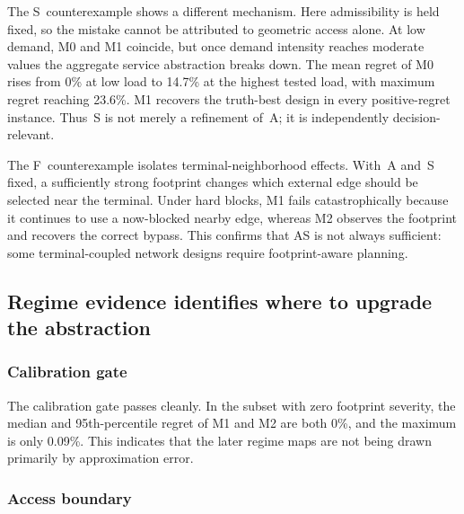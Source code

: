 \documentclass[review,authoryear]{elsarticle}
\begin{document}
The S~counterexample shows a different mechanism. Here admissibility is held fixed, so the mistake cannot be attributed to geometric access alone. At low demand, M0 and M1 coincide, but once demand intensity reaches moderate values the aggregate service abstraction breaks down. The mean regret of M0 rises from 0\% at low load to 14.7\% at the highest tested load, with maximum regret reaching 23.6\%. M1 recovers the truth-best design in every positive-regret instance. Thus~S is not merely a refinement of~A; it is independently decision-relevant.

The F~counterexample isolates terminal-neighborhood effects. With~A and~S fixed, a sufficiently strong footprint changes which external edge should be selected near the terminal. Under hard blocks, M1 fails catastrophically because it continues to use a now-blocked nearby edge, whereas M2 observes the footprint and recovers the correct bypass. This confirms that AS is not always sufficient: some terminal-coupled network designs require footprint-aware planning.

\begin{table}[htbp]
  \centering
  \caption{Minimal-counterexample results for A, S, and F.}
  \label{tab:counterexamples}
\end{table}

\subsection{Regime evidence identifies where to upgrade the abstraction}
\label{sec:results:regime}

\subsubsection{Calibration gate}
\label{sec:results:calibration}

The calibration gate passes cleanly. In the subset with zero footprint severity, the median and 95th-percentile regret of M1 and M2 are both 0\%, and the maximum is only 0.09\%. This indicates that the later regime maps are not being drawn primarily by approximation error.

\subsubsection{Access boundary}
\label{sec:results:access}
\end{document}
